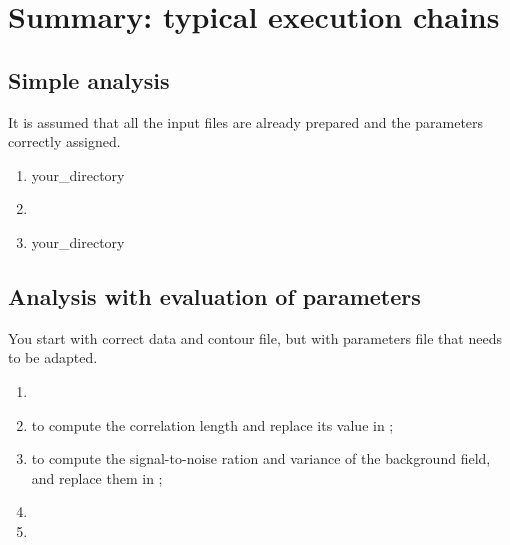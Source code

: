 
\section{Summary: typical execution chains}


\subsection{Simple analysis}

It is assumed that all the input files are already prepared and the parameters correctly assigned.

\begin{enumerate}
\item {} your\_directory
\item {}
\item {} your\_directory
\end{enumerate}



\subsection{Analysis with evaluation of parameters}

You start with correct data and contour file, but with parameters file that needs to be adapted.

\begin{enumerate}
\item {}
\item {} \qquad to compute the correlation length and replace its value in ;
\item {} \qquad to compute the signal-to-noise ration and variance of the background field, and replace them in ;
\item {}
\item {}
\end{enumerate}



